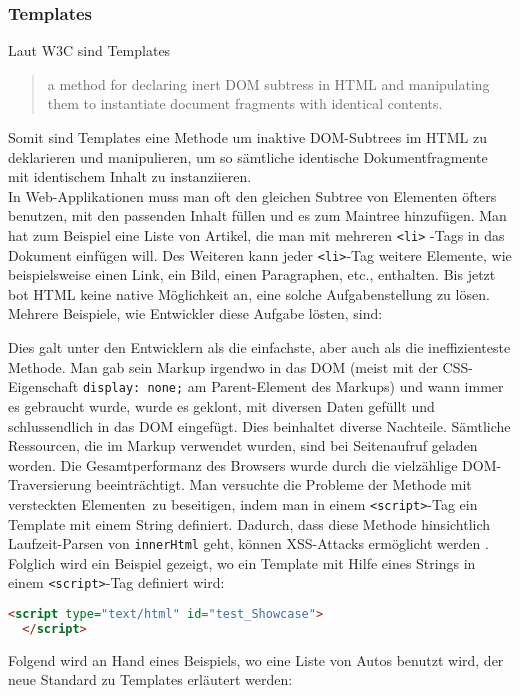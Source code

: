 \subsubsection{Templates}
\label{sec:3_WC_Templates}
Laut W3C sind Templates
\begin{quote}
\glqq
  a method for declaring inert DOM subtress in HTML and manipulating them to instantiate document fragments with identical contents.
\grqq
\end{quote}
Somit sind Templates eine Methode um inaktive DOM-Subtrees im HTML zu deklarieren und manipulieren, um so sämtliche identische Dokumentfragmente mit identischem Inhalt zu instanziieren.\\
In Web-Applikationen muss man oft den gleichen Subtree von Elementen öfters benutzen, mit den passenden Inhalt füllen und es zum Maintree hinzufügen. Man hat zum Beispiel eine Liste von Artikel, die man mit mehreren \lstinline|<li>| -Tags in das Dokument einfügen will. Des Weiteren kann jeder \lstinline|<li>|-Tag weitere Elemente, wie beispielsweise einen Link, ein Bild, einen Paragraphen, etc., enthalten. Bis jetzt bot HTML keine native Möglichkeit an, eine solche Aufgabenstellung zu lösen. Mehrere Beispiele, wie Entwickler diese Aufgabe lösten, sind:
\begin{enumerate}
Dies galt unter den Entwicklern als die einfachste, aber auch als die ineffizienteste Methode. Man gab sein Markup irgendwo in das DOM (meist mit der CSS-Eigenschaft \lstinline|display: none;| am Parent-Element des Markups) und wann immer es gebraucht wurde, wurde es geklont, mit diversen Daten gefüllt und schlussendlich in das DOM eingefügt. Dies beinhaltet diverse Nachteile. Sämtliche Ressourcen, die im Markup verwendet wurden, sind bei Seitenaufruf geladen worden. Die Gesamtperformanz des Browsers wurde durch die vielzählige DOM-Traversierung beeinträchtigt.
Man versuchte die Probleme der Methode mit \glqq versteckten Elementen\grqq\ zu beseitigen, indem man in einem \lstinline|<script>|-Tag ein Template mit einem String definiert. Dadurch, dass diese Methode hinsichtlich Laufzeit-Parsen von \lstinline|innerHtml| geht, können XSS-Attacks ermöglicht werden . Folglich wird ein Beispiel gezeigt, wo ein Template mit Hilfe eines Strings in einem \lstinline|<script>|-Tag definiert wird:
\begin{lstlisting}[language=HTML, caption=String-Template]
  <script type="text/html" id="test_Showcase">
  </script>
\end{lstlisting}
\end{enumerate}
Folgend wird an Hand eines Beispiels, wo eine Liste von Autos benutzt wird, der neue Standard zu Templates erläutert werden:\\

